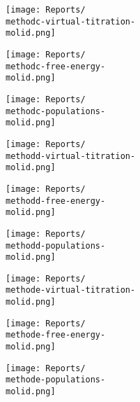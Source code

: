 \documentclass[9pt]{standalone}
\begin{document}
\begin{minipage}[s]{\textwidth}\centering
{\textbf \methodc}
\end{minipage}

\noindent
\begin{minipage}[s]{0.33\textwidth}\centering
\texttt{[image: Reports/\\methodc-virtual-titration-\\molid.png]}
\end{minipage}
\begin{minipage}[s]{0.33\textwidth}
\texttt{[image: Reports/\\methodc-free-energy-\\molid.png]}
\end{minipage}
\begin{minipage}[s]{0.33\textwidth}
\texttt{[image: Reports/\\methodc-populations-\\molid.png]}
\end{minipage}

\begin{minipage}[s]{\textwidth}\centering
{\textbf \methodd}
\end{minipage}

\noindent
\begin{minipage}[s]{0.33\textwidth}\centering
\texttt{[image: Reports/\\methodd-virtual-titration-\\molid.png]}
\end{minipage}
\begin{minipage}[s]{0.33\textwidth}
\texttt{[image: Reports/\\methodd-free-energy-\\molid.png]}
\end{minipage}
\begin{minipage}[s]{0.33\textwidth}
\texttt{[image: Reports/\\methodd-populations-\\molid.png]}
\end{minipage}

\begin{minipage}[s]{\textwidth}\centering
{\textbf \methode}
\end{minipage}

\noindent
\begin{minipage}[s]{0.33\textwidth}\centering
\texttt{[image: Reports/\\methode-virtual-titration-\\molid.png]}
\end{minipage}
\begin{minipage}[s]{0.33\textwidth}
\texttt{[image: Reports/\\methode-free-energy-\\molid.png]}
\end{minipage}
\begin{minipage}[s]{0.33\textwidth}
\texttt{[image: Reports/\\methode-populations-\\molid.png]}
\end{minipage}
\end{document}
